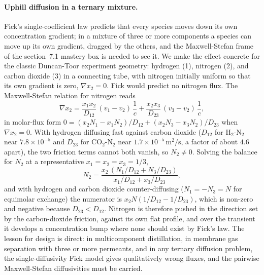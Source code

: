 \paragraph{Uphill diffusion in a ternary mixture.} Fick's single-coefficient
law predicts that every species moves down its own concentration gradient;
in a mixture of three or more components a species can move up its own
gradient, dragged by the others, and the Maxwell-Stefan frame of the
section~7.1 mastery box is needed to see it. We make the effect concrete
for the classic Duncan-Toor experiment geometry: hydrogen (1), nitrogen
(2), and carbon dioxide (3) in a connecting tube, with nitrogen initially
uniform so that its own gradient is zero, $\nabla x_2 = 0$. Fick would
predict no nitrogen flux. The Maxwell-Stefan relation for nitrogen reads
\[
\nabla x_2 = \frac{x_1 x_2}{D_{12}}\,(v_1 - v_2)\,\frac{1}{c} +
\frac{x_2 x_3}{D_{23}}\,(v_3 - v_2)\,\frac{1}{c},
\]
in molar-flux form $0 = (x_2 N_1 - x_1 N_2)/D_{12} + (x_2 N_3 - x_3 N_2)/
D_{23}$ when $\nabla x_2 = 0$. With hydrogen diffusing fast against carbon
dioxide ($D_{12}$ for H$_2$-N$_2$ near $7.8\times 10^{-5}$ and $D_{23}$ for
CO$_2$-N$_2$ near $1.7\times 10^{-5}\,\si{\meter\squared\per\second}$, a
factor of about $4.6$ apart), the two friction terms cannot both vanish, so
$N_2 \neq 0$. Solving the balance for $N_2$ at a representative
$x_1 = x_2 = x_3 = 1/3$,
\[
N_2 = \frac{x_2\,(N_1/D_{12} + N_3/D_{23})}{x_1/D_{12} + x_3/D_{23}},
\]
and with hydrogen and carbon dioxide counter-diffusing ($N_1 = -N_3 = N$
for equimolar exchange) the numerator is $x_2 N(1/D_{12} - 1/D_{23})$, which
is non-zero and negative because $D_{23} < D_{12}$. Nitrogen is therefore
pushed in the direction set by the carbon-dioxide friction, against its own
flat profile, and over the transient it develops a concentration bump where
none should exist by Fick's law. The lesson for design is direct: in
multicomponent distillation, in membrane gas separation with three or more
permeants, and in any ternary diffusion problem, the single-diffusivity
Fick model gives qualitatively wrong fluxes, and the pairwise
Maxwell-Stefan diffusivities must be carried.

